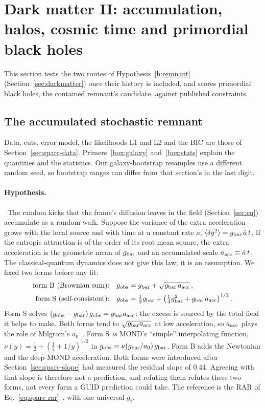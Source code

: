 \section{Dark matter II: accumulation, halos, cosmic time and primordial black holes}\label{sec:remnant}

This section tests the two routes of Hypothesis~\ref{h:remnant} (Section~\ref{sec:darkmatter}) once their history is included, and scores
primordial black holes, the contained remnant's candidate, against published constraints.

\subsection{The accumulated stochastic remnant}\label{sec:remnant-acc}

Data, cuts, error model, the likelihoods L1 and L2 and the BIC are those of Section~\ref{sec:sparc-data}. Primers~\ref{box:galaxy}
and~\ref{box:stats} explain the quantities and the statistics. Our galaxy-bootstrap resamples use a different random seed, so bootstrap
ranges can differ from that section's in the last digit.

\paragraph{Hypothesis.} \tagH\ The random kicks that the frame's diffusion leaves in the field (Section~\ref{sec:cq}) accumulate as a random
walk. Suppose the variance of the extra acceleration grows with the local source and with time at a constant rate $\dot a$,
$\langle\delta g^2\rangle=g_{\rm bar}\,\dot a\,t$. If the entropic attraction is of the order of its root mean square, the extra acceleration
is the geometric mean of $g_{\rm bar}$ and an accumulated scale $a_{\rm acc}\equiv\dot a\,t$. The classical-quantum dynamics does not give this
law; it is an assumption. We fixed two forms before any fit:
\begin{align}
\text{form B (Brownian sum):}\quad & g_{\rm obs}=g_{\rm bar}+\sqrt{g_{\rm bar}\,a_{\rm acc}}\,,\label{eq:formB}\\
\text{form S (self-consistent):}\quad & g_{\rm obs}=\tfrac12 g_{\rm bar}+\big(\tfrac14 g_{\rm bar}^2+g_{\rm bar}\,a_{\rm acc}\big)^{1/2}\,.
\label{eq:formS}
\end{align}
Form S solves $(g_{\rm obs}-g_{\rm bar})\,g_{\rm obs}=g_{\rm bar}a_{\rm acc}$: the excess is sourced by the total field it helps to make. Both
forms tend to $\sqrt{g_{\rm bar}a_{\rm acc}}$ at low acceleration, so $a_{\rm acc}$ plays the role of Milgrom's $a_0$~\cite{milgrom}. Form S
\emph{is} MOND's ``simple'' interpolating function, $\nu(y)=\tfrac12+(\tfrac14+1/y)^{1/2}$ in $g_{\rm obs}=\nu(g_{\rm bar}/a_0)\,g_{\rm bar}$.
Form B adds the Newtonian and the deep-MOND acceleration. Both forms were introduced after Section~\ref{sec:sparc-slope} had measured the
residual slope of 0.44. Agreeing with that slope is therefore not a prediction, and refuting them refutes these two forms, not every form a
GUID prediction could take. The reference is the RAR of Eq.~\eqref{eq:sparc-rar}~\cite{mcgaugh2016}, with one universal $g_\dagger$.

